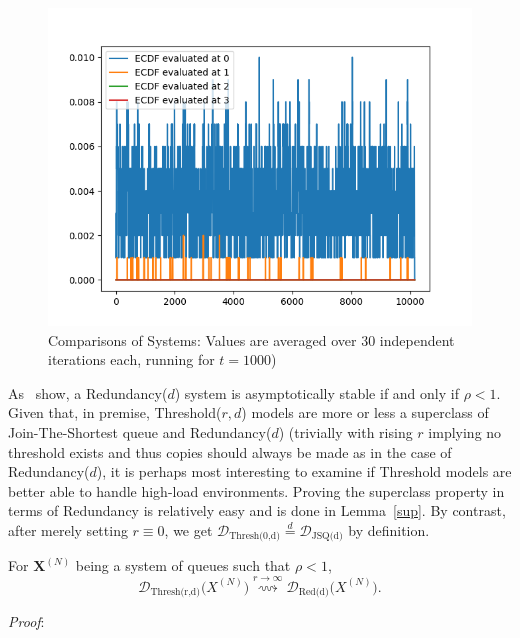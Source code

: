 \begin{figure}
    \centering
    \includegraphics[width=0.7\linewidth]{attimes.png} %
    \caption{Comparisons of Systems: Values are averaged over 30 independent iterations each, running for $t=1000$)}
    \label{fig:img}
\end{figure}

As~\cite{gardner_redundancy-d_2017} show, a Redundancy($d$) system is asymptotically stable if and only if $\rho < 1 $. Given that, in premise, Threshold($r,d$) models are more or less a superclass of Join-The-Shortest queue and Redundancy($d$) (trivially with rising $r$  implying no threshold exists and thus copies should always be made as in the case of Redundancy($d$), it is perhaps most interesting to examine if Threshold models are better able to handle high-load environments. Proving the superclass property in terms of Redundancy is relatively easy and is done in Lemma~\ref{sup}. By contrast, after merely setting $r \equiv 0$, we get $ \mathcal{D}_{\text{Thresh(0,d)}} \overset{d}{=} \mathcal{D}_{\text{JSQ(d)}}$ by definition.


\begin{lemma}
    \label{sup}
    For $\mathbf{X}^{(N)}$ being a system of queues such that $\rho < 1$, \[\mathcal{D}_{\text{Thresh(r,d)}}\mathbf(X^{(N)}) \overset{r \rightarrow \infty}{\rightsquigarrow} \mathcal{D}_{\text{Red(d)}}\mathbf(X^{(N)}).\]
\end{lemma}
\textit{Proof}:

